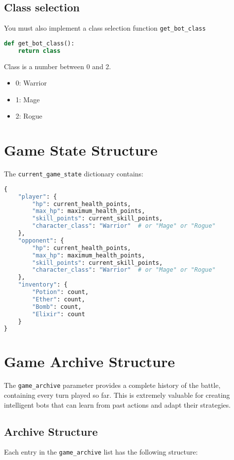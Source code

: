 \documentclass[12pt]{article}
\begin{document}
\subsection{Class selection}
You must also implement a class selection function \texttt{get\_bot\_class}

\begin{lstlisting}[language=Python, caption=Bot Function Signature]
def get_bot_class():
    return class
\end{lstlisting}

Class is a number between 0 and 2. 
\begin{itemize}
    \item 0: Warrior
    \item 1: Mage
    \item 2: Rogue
\end{itemize}

\section{Game State Structure}
\label{sec:game-state}

The \texttt{current\_game\_state} dictionary contains:

\begin{lstlisting}[language=Python, caption=Game State Structure]
{
    "player": {
        "hp": current_health_points,
        "max_hp": maximum_health_points,
        "skill_points": current_skill_points,
        "character_class": "Warrior"  # or "Mage" or "Rogue"
    },
    "opponent": {
        "hp": current_health_points,
        "max_hp": maximum_health_points,
        "skill_points": current_skill_points,
        "character_class": "Warrior"  # or "Mage" or "Rogue"
    },
    "inventory": {
        "Potion": count,
        "Ether": count,
        "Bomb": count,
        "Elixir": count
    }
}
\end{lstlisting}

\section{Game Archive Structure}
\label{sec:game-archive}

The \texttt{game\_archive} parameter provides a complete history of the battle, containing every turn played so far. This is extremely valuable for creating intelligent bots that can learn from past actions and adapt their strategies.

\subsection{Archive Structure}
Each entry in the \texttt{game\_archive} list has the following structure:
\end{document}
